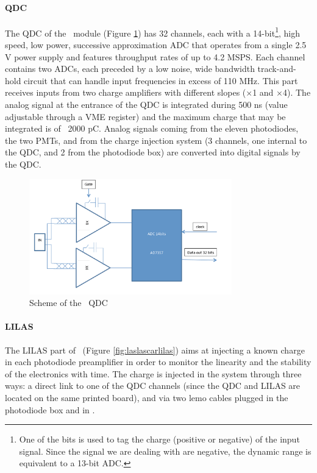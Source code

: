 \paragraph{QDC}

The QDC of the \lascar~module (Figure \ref{fig:laslascarqdc}) has 32 channels, each with a 14-bit\footnote{One of the bits is used to tag the charge (positive or negative) of the input signal. Since the signal we are dealing with are negative, the dynamic range is equivalent to a 13-bit ADC.}, high speed, low power, successive approximation ADC that operates from a single 2.5 V power supply and features throughput rates of up to 4.2 MSPS. Each channel contains two ADCs, each preceded by a low noise, wide bandwidth track-and-hold circuit that can handle input frequencies in excess of 110 MHz. This part receives inputs from two charge amplifiers with different slopes ($\times$1 and $\times$4). The analog signal at the entrance of the QDC is integrated during 500 ns (value adjustable through a VME register) and the maximum charge that may be integrated is of ~2000 pC. Analog signals coming from the eleven photodiodes, the two PMTs, and from the charge injection system (3 channels, one internal to the QDC, and 2 from the photodiode box) are converted into digital signals by the QDC. 
 
\begin{figure}[htbp]

\centering
\includegraphics[height=5cm]{figures/qdc.pdf}
\caption{Scheme of the \lascar~QDC}\label{fig:laslascarqdc}
\end{figure}

\paragraph{LILAS}
The LILAS part of \lascar~(Figure \ref{fig:laslascarlilas}) aims at injecting a known charge in each photodiode preamplifier in order to monitor the linearity and the stability of the electronics with time. The charge is injected in the system through three ways: a direct link to one of the QDC channels (since the QDC and LILAS are located on the same printed board), and via two lemo cables plugged in the photodiode box and in \phocal.  

